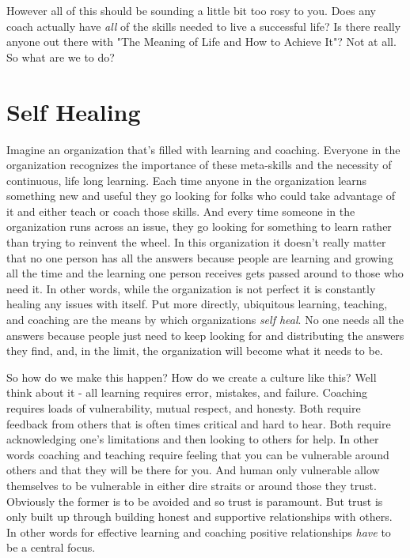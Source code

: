 \documentclass[11pt,a5paper]{book}
\begin{document}
However all of this should be sounding a little bit too rosy to you. Does any coach actually have \textit{all} of the skills needed to live a successful life? Is there really anyone out there with "The Meaning of Life and How to Achieve It"? Not at all. So what are we to do? 

\section{Self Healing}
Imagine an organization that's filled with learning and coaching. Everyone in the organization recognizes the importance of these meta-skills and the necessity of continuous, life long learning. Each time anyone in the organization learns something new and useful they go looking for folks who could take advantage of it and either teach or coach those skills. And every time someone in the organization runs across an issue, they go looking for something to learn rather than trying to reinvent the wheel. In this organization it doesn't really matter that no one person has all the answers because people are learning and growing all the time and the learning one person receives gets passed around to those who need it. In other words, while the organization is not perfect it is constantly healing any issues with itself. Put more directly, ubiquitous learning, teaching, and coaching are the means by which organizations \textit{self heal}. No one needs all the answers because people just need to keep looking for and distributing the answers they find, and, in the limit, the organization will become what it needs to be.
\newline

So how do we make this happen? How do we create a culture like this? Well think about it - all learning requires error, mistakes, and failure. Coaching requires loads of vulnerability, mutual respect, and honesty. Both require feedback from others that is often times critical and hard to hear. Both require acknowledging one's limitations and then looking to others for help. In other words coaching and teaching require feeling that you can be vulnerable around others and that they will be there for you. And human only vulnerable allow themselves to be vulnerable in either dire straits or around those they trust. Obviously the former is to be avoided and so trust is paramount. But trust is only built up through building honest and supportive relationships with others. In other words for effective learning and coaching positive relationships \textit{have} to be a central focus.
\newline
\end{document}
